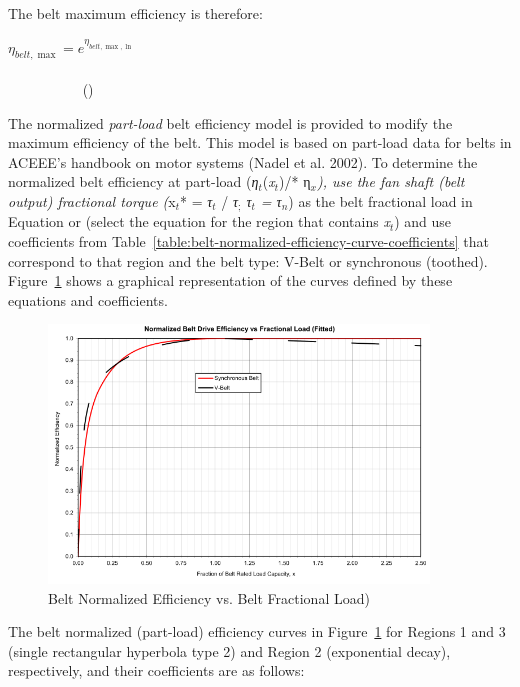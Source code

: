 The belt maximum efficiency is therefore:

\({\eta_{belt,\max }} = {e^{{\eta_{belt,\max ,\ln }}}}\) ~~~~~~~~~~~~~~~~~~~~~~~~~~~~~~~~~~~~~~~~~~~~~~~~~~~~~~~~~~~~~~~~~~~~~~~~~~~~~~~~~~ ()

The normalized \emph{part-load} belt efficiency model is provided to modify the maximum efficiency of the belt. This model is based on part-load data for belts in ACEEE's handbook on motor systems (Nadel et al. 2002). To determine the normalized belt efficiency at part-load (\emph{η\(_{t}\)}(\emph{x\(_{t}\)})/* η\(_{x}\)\emph{), use the fan shaft (belt output) fractional torque (}x\(_{t}\)* = \emph{τ\(_{t}\)} / \emph{τ\(_{;}\) τ\(_{t}\) = τ\(_{n}\)}) as the belt fractional load in Equation or (select the equation for the region that contains \emph{x\(_{t}\)}) and use coefficients from Table~\ref{table:belt-normalized-efficiency-curve-coefficients} that correspond to that region and the belt type: V-Belt or synchronous (toothed). Figure~\ref{fig:belt-normalized-efficiency-vs.-belt} shows a graphical representation of the curves defined by these equations and coefficients.

\begin{figure}[hbtp] %
\centering
\includegraphics[width=0.9\textwidth, height=0.9\textheight, keepaspectratio=true]{media/image4910.svg.png}
\caption{Belt Normalized Efficiency vs. Belt Fractional Load) \protect \label{fig:belt-normalized-efficiency-vs.-belt}}
\end{figure}

The belt normalized (part-load) efficiency curves in Figure~\ref{fig:belt-normalized-efficiency-vs.-belt} for Regions 1 and 3 (single rectangular hyperbola type 2) and Region 2 (exponential decay), respectively, and their coefficients are as follows:

